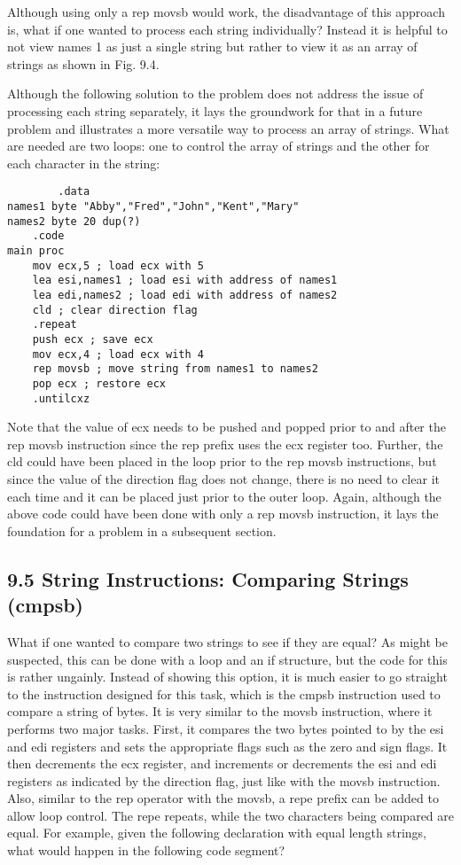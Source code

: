 \documentclass[10pt]{article}
\begin{document}
Although using only a rep movsb would work, the disadvantage of this approach is, what if one wanted to process each string individually? Instead it is helpful to not view names 1 as just a single string but rather to view it as an array of strings as shown in Fig. 9.4.

Although the following solution to the problem does not address the issue of processing each string separately, it lays the groundwork for that in a future problem and illustrates a more versatile way to process an array of strings. What are needed are two loops: one to control the array of strings and the other for each character in the string:

\begin{verbatim}
        .data
names1 byte "Abby","Fred","John","Kent","Mary"
names2 byte 20 dup(?)
    .code
main proc
    mov ecx,5 ; load ecx with 5
    lea esi,names1 ; load esi with address of names1
    lea edi,names2 ; load edi with address of names2
    cld ; clear direction flag
    .repeat
    push ecx ; save ecx
    mov ecx,4 ; load ecx with 4
    rep movsb ; move string from names1 to names2
    pop ecx ; restore ecx
    .untilcxz
\end{verbatim}

Note that the value of ecx needs to be pushed and popped prior to and after the rep movsb instruction since the rep prefix uses the ecx register too. Further, the cld could have been placed in the loop prior to the rep movsb instructions, but since the value of the direction flag does not change, there is no need to clear it each time and it can be placed just prior to the outer loop. Again, although the above code could have been done with only a rep movsb instruction, it lays the foundation for a problem in a subsequent section.

\subsection*{9.5 String Instructions: Comparing Strings (cmpsb)}
What if one wanted to compare two strings to see if they are equal? As might be suspected, this can be done with a loop and an if structure, but the code for this is rather ungainly. Instead of showing this option, it is much easier to go straight to the instruction designed for this task, which is the cmpsb instruction used to compare a string of bytes. It is very similar to the movsb instruction, where it performs two major tasks. First, it compares the two bytes pointed to by the esi and edi registers and sets the appropriate flags such as the zero and sign flags. It then decrements the ecx register, and increments or decrements the esi and edi registers as indicated by the direction flag, just like with the movsb instruction. Also, similar to the rep operator with the movsb, a repe prefix can be added to allow loop control. The repe repeats, while the two characters being compared are equal. For example, given the following declaration with equal length strings, what would happen in the following code segment?
\end{document}

